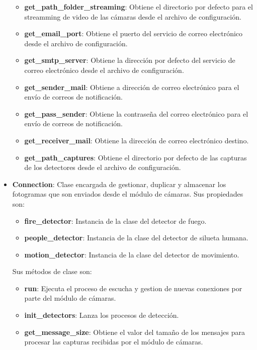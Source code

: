 \begin{itemize}
\begin{itemize}
            \item \textbf{get\_path\_folder\_streaming}: Obtiene el directorio por defecto para el streamming de video de las cámaras desde el archivo de configuración.
            \item \textbf{get\_email\_port}: Obtiene el puerto del servicio de correo electrónico desde el archivo de configuración.
            \item \textbf{get\_smtp\_server}: Obtiene la dirección por defecto del servicio de correo electrónico desde el archivo de configuración.
            \item \textbf{get\_sender\_mail}: Obtiene a dirección de correo electrónico para el envío de correos de notificación. 
            \item \textbf{get\_pass\_sender}: Obtiene la contraseña del correo electrónico para el envío de correos de notificación. 
            \item \textbf{get\_receiver\_mail}: Obtiene la dirección de correo electrónico destino.
            \item \textbf{get\_path\_captures}: Obtiene el directorio por defecto de las capturas de los detectores desde el archivo de configuración.
        \end{itemize}
    \item \textbf{Connection}: Clase encargada de gestionar, duplicar y almacenar los fotogramas que son enviados desde el módulo de cámaras. Sus propiedades son:
        \begin{itemize}
            \item \textbf{fire\_detector}: Instancia de la clase del detector de fuego.
            \item \textbf{people\_detector}: Instancia de la clase del detector de silueta humana.
            \item \textbf{motion\_detector}: Instancia de la clase del detector de movimiento.
        \end{itemize}
        Sus métodos de clase son:
        \begin{itemize}
            \item \textbf{run}: Ejecuta el proceso de escucha y gestion de nuevas conexiones por parte del módulo de cámaras.
            \item \textbf{init\_detectors}: Lanza los procesos de detección.
            \item \textbf{get\_message\_size}: Obtiene el valor del tamaño de los mensajes para procesar las capturas recibidas por el módulo de cámaras.

\end{itemize}
\end{itemize}
